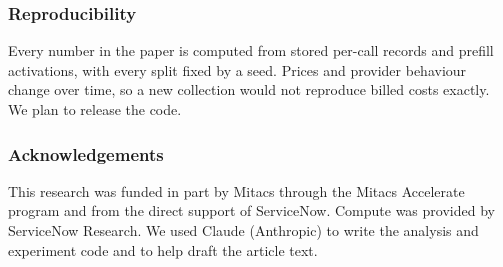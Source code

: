 \documentclass[10pt]{article}
\begin{document}
\subsubsection*{Reproducibility}
Every number in the paper is computed from stored per-call records and prefill activations, with every split fixed by a seed. Prices and provider behaviour change over time, so a new collection would not reproduce billed costs exactly. We plan to release the code.

\ifdefined\anonymous\else
\subsubsection*{Acknowledgements}
This research was funded in part by Mitacs through the Mitacs Accelerate program and from the direct support of ServiceNow. Compute was provided by ServiceNow Research. We used Claude (Anthropic) to write the analysis and experiment code and to help draft the article text.
\fi




\appendix
\FloatBarrier
\end{document}
